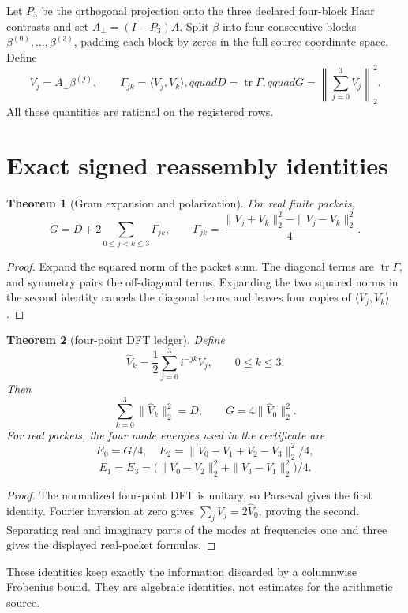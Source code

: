 \documentclass[11pt]{article}
\newcommand{\Aperp}{A_{\perp}}
\newcommand{\Dpack}{D}
\newtheorem{theorem}{Theorem}
\begin{document}
Let \(P_3\) be the orthogonal projection onto the three declared four-block
Haar contrasts and set \(\Aperp=(I-P_3)A\).  Split \(\beta\) into four
consecutive blocks \(\beta^{(0)},\ldots,\beta^{(3)}\), padding each block by
zeros in the full source coordinate space.  Define
\[
 V_j=\Aperp\beta^{(j)},\qquad
 \Gamma_{jk}=\langle V_j,V_k\rangle,qquad
 \Dpack=\operatorname{tr}\Gamma,qquad
 G=\left\|\sum_{j=0}^3V_j\right\|_2^2.
\]
All these quantities are rational on the registered rows.

\section{Exact signed reassembly identities}

\begin{theorem}[Gram expansion and polarization]
For real finite packets,
\[
 G=\Dpack+2\sum_{0\leq j<k\leq3}\Gamma_{jk},
 \qquad
 \Gamma_{jk}=\frac{\|V_j+V_k\|_2^2-\|V_j-V_k\|_2^2}{4}.
\]
\end{theorem}

\begin{proof}
Expand the squared norm of the packet sum.  The diagonal terms are
\(\operatorname{tr}\Gamma\), and symmetry pairs the off-diagonal terms.
Expanding the two squared norms in the second identity cancels the diagonal
terms and leaves four copies of \(\langle V_j,V_k\rangle\).
\end{proof}

\begin{theorem}[four-point DFT ledger]
Define
\[
 \widehat V_k=\frac12\sum_{j=0}^3 i^{-jk}V_j,\qquad 0\leq k\leq3.
\]
Then
\[
 \sum_{k=0}^3\|\widehat V_k\|_2^2=\Dpack,
 \qquad G=4\|\widehat V_0\|_2^2.
\]
For real packets, the four mode energies used in the certificate are
\[
 E_0=G/4,\quad E_2=\|V_0-V_1+V_2-V_3\|_2^2/4,
\]
\[
 E_1=E_3=\bigl(\|V_0-V_2\|_2^2+\|V_3-V_1\|_2^2\bigr)/4.
\]
\end{theorem}

\begin{proof}
The normalized four-point DFT is unitary, so Parseval gives the first
identity.  Fourier inversion at zero gives
\(\sum_jV_j=2\widehat V_0\), proving the second.  Separating real and
imaginary parts of the modes at frequencies one and three gives the displayed
real-packet formulas.
\end{proof}

These identities keep exactly the information discarded by a columnwise
Frobenius bound.  They are algebraic identities, not estimates for the
arithmetic source.
\end{document}
